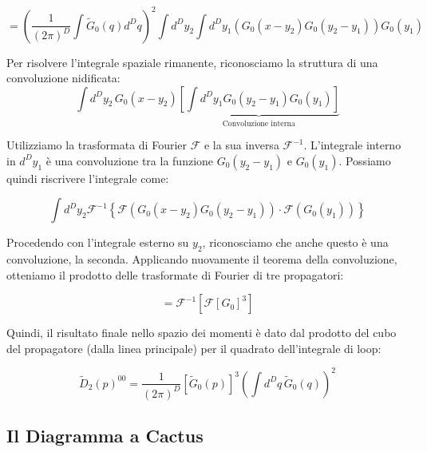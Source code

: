 \begin{equation}
= \left( \frac{1}{(2\pi)^D} \int \tilde{G}_0(q) d^D q \right)^2 \int d^D y_2 \int d^D y_1 \left( G_0(x-y_2) G_0(y_2-y_1) \right) G_0(y_1)
\end{equation}

\noindent Per risolvere l'integrale spaziale rimanente, riconosciamo la struttura di una convoluzione nidificata:
\begin{equation}
\int d^D y_2 \, G_0(x-y_2) \underbrace{\left[ \int d^D y_1 G_0(y_2-y_1) G_0(y_1) \right]}_{\text{Convoluzione interna}}
\end{equation}

\noindent Utilizziamo la trasformata di Fourier $\mathcal{F}$ e la sua inversa $\mathcal{F}^{-1}$.
L'integrale interno in $d^D y_1$ è una convoluzione tra la funzione $G_0(y_2 - y_1)$ e $G_0(y_1)$.
Possiamo quindi riscrivere l'integrale come:

\begin{equation}
\int d^D y_2 \mathcal{F}^{-1} \left\{ \mathcal{F} (G_0(x-y_2) G_0(y_2-y_1)) \cdot \mathcal{F}(G_0(y_1)) \right\}
\end{equation}


\noindent Procedendo con l'integrale esterno su $y_2$, riconosciamo che anche questo è una convoluzione, la seconda.
Applicando nuovamente il teorema della convoluzione, otteniamo il prodotto delle trasformate di Fourier di tre propagatori:

\begin{equation}
= \mathcal{F}^{-1} \left[ \mathcal{F}[G_0]^3 \right]
\end{equation}

Quindi, il risultato finale nello spazio dei momenti è dato dal prodotto del cubo del propagatore (dalla linea principale) per il quadrato dell'integrale di loop:

\begin{tcolorbox}[colback=colorA!10, colframe=colorB!60!colorA,  title=\textbf{Diagramma a Doppia Bolla}]
\begin{equation}
\tilde{D}_2(p)^{00} = \frac{1}{(2\pi)^D} \left[ \tilde{G}_0(p) \right]^3 \left( \int d^D q \, \tilde{G}_0(q) \right)^2
\end{equation}
\end{tcolorbox}

\newpage
\subsection{Il Diagramma a Cactus}


